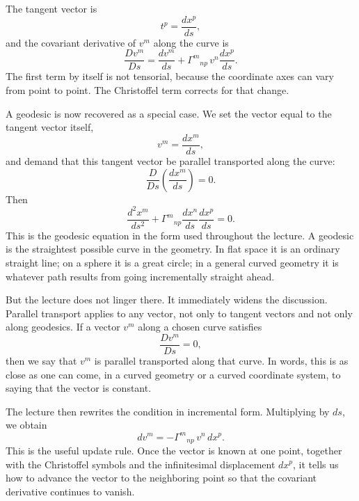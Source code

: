 The tangent vector is
\begin{equation}
t^{p}=\frac{dx^{p}}{ds},
\end{equation}
and the covariant derivative of \(v^{m}\) along the curve is
\begin{equation}
\frac{D v^{m}}{Ds}
=
\frac{dv^{m}}{ds}
+
\Gamma^{m}{}_{np}\,v^{n}\frac{dx^{p}}{ds}.
\end{equation}
The first term by itself is not tensorial, because the coordinate axes can vary from point to point. The Christoffel term corrects for that change.

A geodesic is now recovered as a special case. We set the vector equal to the tangent vector itself,
\[
v^{m}=\frac{dx^{m}}{ds},
\]
and demand that this tangent vector be parallel transported along the curve:
\begin{equation}
\frac{D}{Ds}\left(\frac{dx^{m}}{ds}\right)=0.
\end{equation}
Then
\begin{equation}
\frac{d^{2}x^{m}}{ds^{2}}
+
\Gamma^{m}{}_{np}\frac{dx^{n}}{ds}\frac{dx^{p}}{ds}
=0.
\end{equation}
This is the geodesic equation in the form used throughout the lecture. A geodesic is the straightest possible curve in the geometry. In flat space it is an ordinary straight line; on a sphere it is a great circle; in a general curved geometry it is whatever path results from going incrementally straight ahead.

But the lecture does not linger there. It immediately widens the discussion. Parallel transport applies to any vector, not only to tangent vectors and not only along geodesics. If a vector \(v^{m}\) along a chosen curve satisfies
\begin{equation}
\frac{D v^{m}}{Ds}=0,
\end{equation}
then we say that \(v^{m}\) is parallel transported along that curve. In words, this is as close as one can come, in a curved geometry or a curved coordinate system, to saying that the vector is constant.

The lecture then rewrites the condition in incremental form. Multiplying by \(ds\), we obtain
\begin{equation}
dv^{m}=-\Gamma^{m}{}_{np}\,v^{n}\,dx^{p}.
\end{equation}
This is the useful update rule. Once the vector is known at one point, together with the Christoffel symbols and the infinitesimal displacement \(dx^{p}\), it tells us how to advance the vector to the neighboring point so that the covariant derivative continues to vanish.

